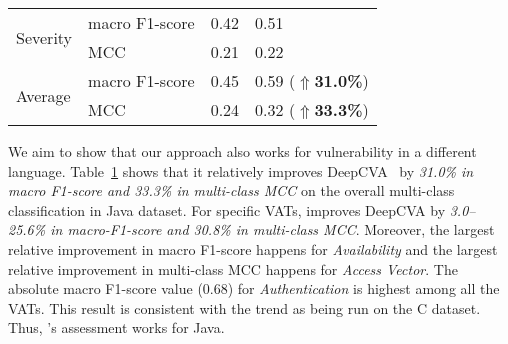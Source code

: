 \begin{table}[t]
\begin{center}
\begin{tabular}{l|p{1.9cm}<{\centering}|p{1.5cm}<{\centering}|p{1.5cm}<{\centering}}
			\hline
			\multirow{2}{*}{Severity}        & macro F1-score                             &   0.42         & 0.51\\
			\cline{2-4}
			& MCC                                 &   0.21         & 0.22\\
			\hline
			\hline
			\multirow{2}{*}{Average}         & macro F1-score                             &    0.45        & 0.59 ($\Uparrow${\bf 31.0\%})\\
			\cline{2-4}
			& MCC                                 & 0.24           & 0.32 ($\Uparrow${\bf 33.3\%})\\
			\hline
		\end{tabular}
		\label{rq2_results}
	\end{center}
\end{table}

We aim to show that our approach also works for vulnerability in a
different language. Table~\ref{rq2_results} shows that it
relatively improves DeepCVA~\cite{deepCVA-ase21} by {\em 31.0\% in
macro F1-score and 33.3\% in multi-class MCC} on the overall
multi-class classification in Java dataset. For specific VATs, {\tool}
improves DeepCVA by {\em 3.0--25.6\% in macro-F1-score and 30.8\% in
multi-class MCC}. Moreover, the largest relative improvement in macro
F1-score happens for {\em Availability} and the largest relative
improvement in multi-class MCC happens for {\em Access Vector}.
The absolute macro F1-score value (0.68) for {\em Authentication} is
highest among all the VATs. This result is consistent with the trend
as {\tool} being run on the C dataset. Thus, {\tool}'s assessment
works for Java.

